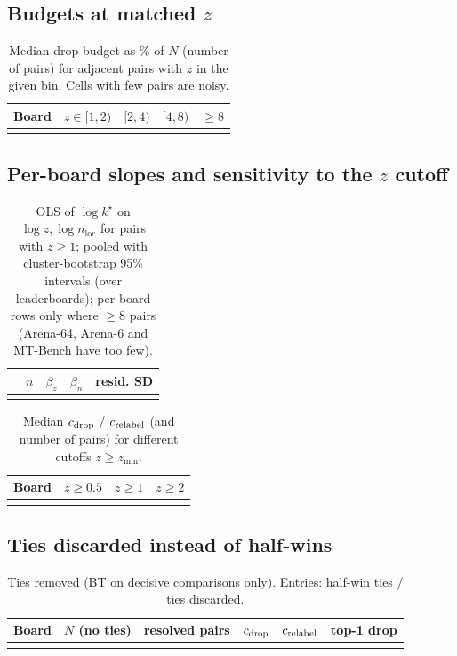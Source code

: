 \documentclass{article}
\theoremstyle{plain}
\theoremstyle{remark}
\newcommand{\nloc}{n_{\mathrm{loc}}}
\newcommand{\kstar}{k^\star}
\begin{document}
\subsection{Budgets at matched $z$}\label{app:zmatched}
\begin{table}[H]
\caption{Median drop budget as \% of $N$ (number of pairs) for adjacent pairs with $z$ in the given bin. Cells with few pairs are noisy.}
\centering\small
\begin{tabular}{lrrrr}
\toprule
Board & $z\in[1,2)$ & $[2,4)$ & $[4,8)$ & $\ge8$\\
\midrule
\\
\bottomrule
\end{tabular}
\end{table}

\subsection{Per-board slopes and sensitivity to the $z$ cutoff}\label{app:slopes}
\begin{table}[H]
\caption{OLS of $\log\kstar$ on $\log z,\log\nloc$ for pairs with $z\ge1$; pooled with cluster-bootstrap 95\% intervals (over leaderboards); per-board rows only where $\ge8$ pairs (Arena-64, Arena-6 and MT-Bench have too few).}
\centering\small
\begin{tabular}{lrrrr}
\toprule
 & $n$ & $\beta_z$ & $\beta_n$ & resid. SD\\
\midrule
\\
\bottomrule
\end{tabular}
\end{table}
\begin{table}[H]
\caption{Median $c_{\rm drop}$ / $c_{\rm relabel}$ (and number of pairs) for different cutoffs $z\ge z_{\min}$.}
\centering\small
\begin{tabular}{lrrr}
\toprule
Board & $z\ge0.5$ & $z\ge1$ & $z\ge2$\\
\midrule
\\
\bottomrule
\end{tabular}
\end{table}

\subsection{Ties discarded instead of half-wins}\label{app:noties}
\begin{table}[H]
\caption{Ties removed (BT on decisive comparisons only). Entries: half-win ties / ties discarded.}
\centering\small
\begin{tabular}{lrrrrr}
\toprule
Board & $N$ (no ties) & resolved pairs & $c_{\rm drop}$ & $c_{\rm relabel}$ & top-1 drop\\
\midrule
\\
\bottomrule
\end{tabular}
\end{table}
\end{document}
